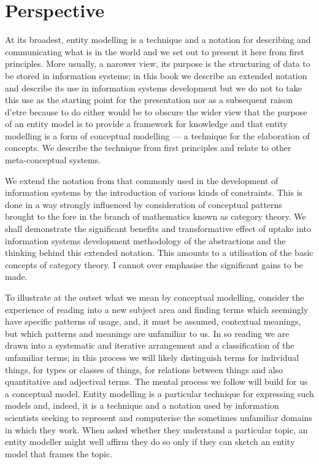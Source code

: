 \section{Perspective}
\label{Perspective}
At its broadest, entity modelling is a technique and a notation for describing and communicating what is in the world and we set out to present it here from first principles. More usually, a narower view, its purpose is the structuring of data to be stored in information systems; in this book we describe an extended notation and describe its use in information systems development but we do not to take this use as the starting point for the presentation nor as a subsequent raison d'etre because to do either would be to obscure the wider view that the purpose of an entity model is to provide a framework for knowledge and that entity modelling is a form of conceptual modelling — a technique for the elaboration of concepts. We describe the technique from first principles and relate to other meta-conceptual systems. 

We extend the notation from that commonly used in the development of information systems by the introduction of various kinds of constraints. This is done in a way strongly influenced by consideration of conceptual patterns brought to the fore in the branch of mathematics known as category theory. We shall demonstrate the significant benefits and transformative effect
of uptake into information systems development methodology of the abstractions and the thinking behind this extended notation. This amounts to a utilisation of the basic concepts of category theory. I cannot over emphasise the significant gains to be made.

To illustrate at the outset what we mean by conceptual modelling, consider the experience of reading into a new subject area and finding terms which seemingly have specific patterns of usage, and, it must be assumed, contextual meanings, but which patterns and meanings are unfamiliar to us. In so reading we are drawn into a systematic and iterative arrangement and a classification of the unfamiliar terms; in this process we will likely distinguish terms for individual things, for types or classes of things, for relations between things and also quantitative and adjectival terms. The mental process we follow will build for us a conceptual model. Entity modelling is a particular technique for expressing such models and, indeed, it is a technique and a notation used by information scientists seeking to represent and computerise the sometimes unfamiliar domains in which they work. When asked whether they understand a particular topic, an entity modeller might well affirm they do so only if they can sketch an entity model that frames the topic.

